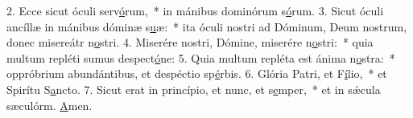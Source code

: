 2. Ecce sicut óculi serv\uline{ó}rum,~* in mánibus dominórum s\uline{ó}rum.
3. Sicut óculi ancíllæ in mánibus dóminæ s\uline{u}æ:~* ita óculi nostri ad Dóminum, Deum nostrum, donec misereátr n\uline{o}stri.
4. Miserére nostri, Dómine, miserére n\uline{o}stri:~* quia multum repléti sumus despect\uline{ó}ne:
5. Quia multum repléta est ánima n\uline{o}stra:~* oppróbrium abundántibus, et despéctio sp\uline{é}rbis.
6. Glória Patri, et F\uline{í}lio,~* et Spirítu S\uline{a}ncto.
7. Sicut erat in princípio, et nunc, et s\uline{e}mper,~* et in sǽcula sæculórm. \uline{A}men.
